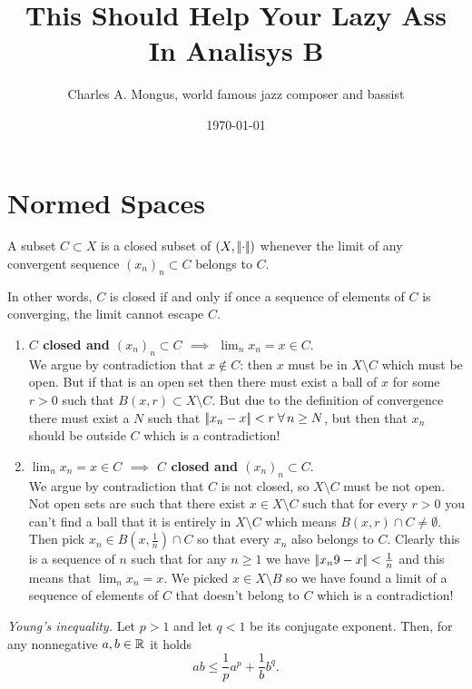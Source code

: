 \documentclass{article}
\title{This Should Help Your Lazy Ass In Analisys B}
\author{Charles A. Mongus, world famous jazz composer and bassist}
\date{\today}
\begin{document}
\maketitle
\tableofcontents
\section{Normed Spaces}
\begin{proposition}
    A subset $C\subset X$ is a closed subset of $(X,\left|\negthinspace\left|\cdot\right|\negthinspace\right|)$ whenever the limit of any convergent sequence ${(x_n)}_n\subset C$ belongs to $C$. 
\end{proposition}
In other words, $C$ is closed if and only if once a sequence of elements of $C$ is converging, the limit cannot escape $C$.
\begin{fancyproof}
    \begin{enumerate}[\circnum]
        \item \textbf{$C$ closed and ${(x_n)}_n\subset C$ $\implies$ $\lim_nx_n=x\in C$}.\\
        We argue by contradiction that $x\not\in C$: then $x$ must be in $X\setminus C$ which must be open. But if that is an open set then there must exist a ball of $x$ for some $r>0$ such that $B(x,r)\subset X\setminus C$. But due to the definition of convergence there must exist a $N$ such that $\left|\negthinspace\left|x_n-x\right|\negthinspace\right|<r\;\forall\, n\geq N$, but then that $x_n$ should be outside $C$ which is a contradiction!
        \item \textbf{$\lim_nx_n=x\in C$ $\implies$ $C$ closed  and ${(x_n)}_n\subset C$}. \\
        We argue by contradiction that $C$ is not closed, so $X\setminus C$ must be not open. Not open sets are such that there exist $x\in X\setminus C$ such that for every $r>0$ you can't find a ball that it is entirely in $X\setminus C$ which means $B(x,r)\cap C\neq\emptyset$. Then pick $x_n\in B(x,\frac{1}{n})\cap C$ so that every $x_n$ also belongs to $C$. Clearly this is a sequence of $n$ such that for any $n\geq1$ we have $\left|\negthinspace\left|x_n9-x\right|\negthinspace\right|<\frac{1}{n}$ and this means that $\lim_nx_n=x$. We picked $x\in X\setminus B$ so we have found a limit of a sequence of elements of $C$ that doesn't belong to $C$ which is a contradiction!
    \end{enumerate}
\end{fancyproof}
\begin{lemma}
		\emph{Young's inequality.} Let $p>1$ and let $q<1$ be its conjugate exponent. Then, for any nonnegative $a,b\in\mathbb{R}$ it holds
		\begin{equation*}
			ab\leq\frac{1}{p}a^{p}+\frac{1}{b}b^q.
		\end{equation*}
\end{lemma}
\end{document}

